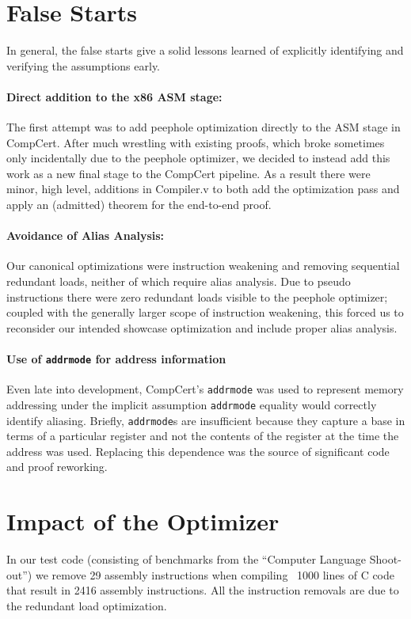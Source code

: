 \documentclass{article}
\begin{document}
\section{False Starts}
In general, the false starts give a solid lessons learned of
explicitly identifying and verifying the assumptions early.


\paragraph{Direct addition to the x86 ASM stage: }
The first attempt was to add peephole optimization directly to the ASM
stage in CompCert.  After much wrestling with existing proofs, which
broke sometimes only incidentally due to the peephole optimizer, we
decided to instead add this work as a new final stage to the CompCert
pipeline.  As a result there were minor, high level, additions in
Compiler.v to both add the optimization pass and apply an (admitted)
theorem for the end-to-end proof.

\paragraph{Avoidance of Alias Analysis: }
Our canonical optimizations were instruction weakening and removing
sequential redundant loads, neither of which require alias analysis.
Due to pseudo instructions there were zero redundant loads visible to
the peephole optimizer; coupled with the generally larger scope of
instruction weakening, this forced us to reconsider our intended
showcase optimization and include proper alias analysis.

\paragraph{Use of {\tt addrmode} for address information}
Even late into development, CompCert's {\tt addrmode} was used to represent
memory addressing under the implicit assumption {\tt addrmode} equality would 
correctly identify aliasing.  Briefly, {\tt addrmode}s are
insufficient because they capture a base in terms of a particular register
and not the contents of the register at the time the address was used.
Replacing this dependence was the source of significant code and proof
reworking.


\section{Impact of the Optimizer}
In our test code (consisting of benchmarks from the ``Computer
Language Shoot-out'') we remove 29 assembly instructions when
compiling ~1000 lines of C code that result in 2416 assembly
instructions.  All the instruction removals are due to the redundant
load optimization. 
\end{document}
